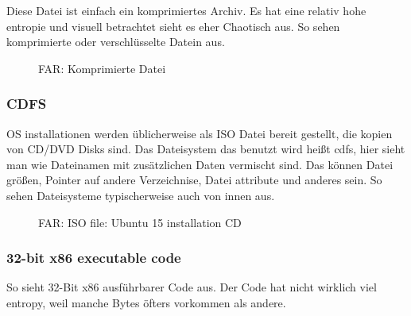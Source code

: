 Diese Datei ist einfach ein komprimiertes Archiv. 
Es hat eine relativ hohe entropie und visuell betrachtet sieht es 
eher Chaotisch aus. So sehen komprimierte oder verschlüsselte Datein aus.


\begin{figure}[H]
\centering
{}
\caption{FAR: Komprimierte Datei}
\end{figure}

\clearpage
\subsubsection{\ac{CDFS}}

\ac{OS} installationen werden üblicherweise als ISO Datei bereit gestellt, die kopien von CD/DVD Disks sind. 
Das Dateisystem das benutzt wird heißt \ac{cdfs}, hier sieht man wie Dateinamen mit zusätzlichen Daten vermischt sind.
Das können Datei größen, Pointer auf andere Verzeichnise, Datei attribute und anderes sein. 
So sehen Dateisysteme typischerweise auch von innen aus.


\begin{figure}[H]
\centering
{}
\caption{FAR: ISO file: Ubuntu 15 installation \ac{CD}}
\end{figure}

\clearpage
\subsubsection{32-bit x86 executable code}

So sieht 32-Bit x86 ausführbarer Code aus. 
Der Code hat nicht wirklich viel entropy, weil manche Bytes öfters vorkommen als andere.


